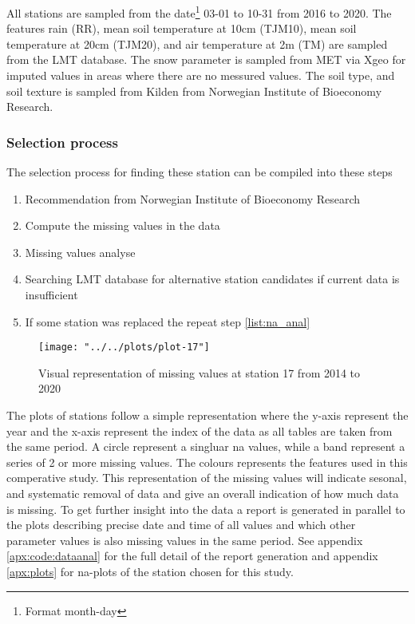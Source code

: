 All stations are sampled from the date\footnote{Format month-day} 03-01 to 10-31 from 2016 to 2020. The features rain (RR), mean soil temperature at 10cm (TJM10), mean soil temperature at 20cm (TJM20), and air temperature at 2m (TM) are sampled from the LMT database. The snow parameter is sampled from MET via Xgeo for imputed values in areas where there are no messured values. The soil type, and soil texture is sampled from Kilden from Norwegian Institute of Bioeconomy Research.

\subsubsection{Selection process}
The selection process for finding these station can be compiled into these steps

\begin{enumerate}
	\item Recommendation from Norwegian Institute of Bioeconomy Research
	\item \label{list:na_anal}Compute the missing values in the data
	\item Missing values analyse 
	\item Searching LMT database for alternative station candidates if current data is insufficient
	\item If some station was replaced the repeat step \ref{list:na_anal}
\end{enumerate}

\begin{figure}
	\centering
	\label{fig:plot-17}
	\texttt{[image: "../../plots/plot-17"]}
	\caption{Visual representation of missing values at station 17 from 2014 to 2020}
\end{figure}

The plots of stations follow a simple representation where the y-axis represent the year and the x-axis represent the index of the data as all tables are taken from the same period. A circle represent a singluar na values, while a band represent a series of 2 or more missing values. The colours represents the features used in this comperative study. This representation of the missing values will indicate sesonal, and systematic removal of data and give an overall indication of how much data is missing. To get further insight into the data a report is generated in parallel to the plots describing precise date and time of all values and which other parameter values is also missing values in the same period. See appendix \ref{apx:code:dataanal} for the full detail of the report generation and appendix \ref{apx:plots} for na-plots of the station chosen for this study.

